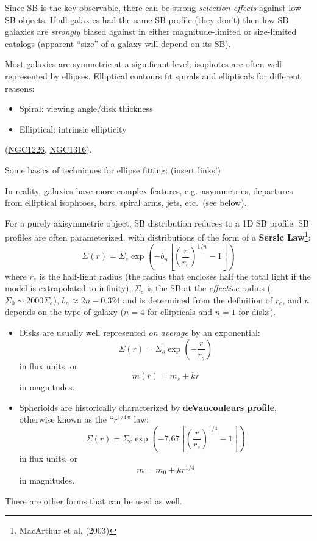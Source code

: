\documentclass{article}
\begin{document}
Since SB is the key observable, there can be strong \emph{selection effects}
against low SB objects. If all galaxies had the same SB profile (they don't)
then low SB galaxies are \emph{strongly} biased against in either
magnitude-limited or size-limited catalogs (apparent ``size'' of a galaxy will
depend on its SB).

Most galaxies are symmetric at a significant level;
isophotes are often well represented by ellipses.
Elliptical contours fit spirals and ellipticals for different reasons:
\begin{itemize}
    \item Spiral: viewing angle/disk thickness
    \item Elliptical: intrinsic ellipticity
\end{itemize}
(\href{http://astronomy.nmsu.edu/holtz/a555/resources/n1226.h.jpg}
{NGC1226},
\href{http://astronomy.nmsu.edu/holtz/a555/resources/n1316.h.jpg}
{NGC1316}).

Some basics of techniques for ellipse fitting: (insert links!)

In reality, galaxies have more complex features, e.g.\ asymmetries,
departures from elliptical isophtoes, bars, spiral arms, jets, etc.\
(see below).

For a purely axisymmetric object, SB distribution reduces to a 1D SB profile.
SB profiles are often parameterized, with distributions of the form
of a \textbf{Sersic Law}\footnote{MacArthur et al. (2003)}:
\[
    \Sigma(r) = \Sigma_e\exp\left(-b_n\left[\left(
    \frac{r}{r_e}\right)^{1/n}-1\right]\right)
\]
where $r_e$ is the half-light radius (the radius that encloses half the
total light if the model is extrapolated to infinity),
$\Sigma_e$ is the SB at the \emph{effective} radius
($\Sigma_0 \sim 2000\Sigma_e$),
$b_{n} \approx 2n - 0.324$ and is determined from the definition of $r_e$,
and $n$ depends on the type of galaxy
($n=4$ for ellipticals and $n=1$ for disks).
\begin{itemize}
    \item Disks are usually well represented \emph{on average} by an exponential:
        \[
            \Sigma(r) = \Sigma_{s}\exp\left(-\frac{r}{r_{s}}\right)
        \]in flux units, or\[
            m(r) = m_s + kr
        \]
        in magnitudes.
    \item Spherioids are historically characterized by
        \textbf{deVaucouleurs profile}, otherwise known as the
        ``$r^{1/4}$'' law:
        \[
            \Sigma(r) = \Sigma_e\exp\left(-7.67\left[\left(
            \frac{r}{r_e}\right)^{1/4}-1\right] \right)
        \]in flux units, or\[
            m = m_0 + kr^{1/4}
        \]
        in magnitudes.
\end{itemize}
There are other forms that can be used as well.
\end{document}
